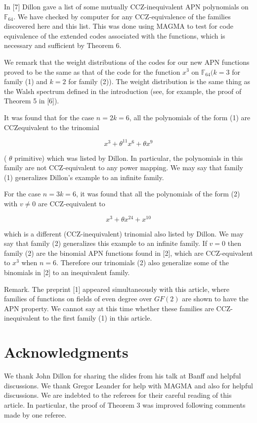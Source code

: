 \documentclass[10pt]{article}
\begin{document}
In [7] Dillon gave a list of some mutually CCZ-inequivalent APN polynomials on $\mathbb{F}_{64}$. We have checked by computer for any CCZ-equivalence of the families discovered here and this list. This was done using MAGMA to test for code equivalence of the extended codes associated with the functions, which is necessary and sufficient by Theorem 6.

We remark that the weight distributions of the codes for our new APN functions proved to be the same as that of the code for the function $x^{3}$ on $\mathbb{F}_{64}(k=3$ for family (1) and $k=2$ for family (2)). The weight distribution is the same thing as the Walsh spectrum defined in the introduction (see, for example, the proof of Theorem 5 in [6]).

It was found that for the case $n=2 k=6$, all the polynomials of the form (1) are CCZequivalent to the trinomial

$$
x^{3}+\theta^{11} x^{6}+\theta x^{9}
$$

( $\theta$ primitive) which was listed by Dillon. In particular, the polynomials in this family are not CCZ-equivalent to any power mapping. We may say that family (1) generalizes Dillon's example to an infinite family.

For the case $n=3 k=6$, it was found that all the polynomials of the form (2) with $v \neq 0$ are CCZ-equivalent to

$$
x^{3}+\theta x^{24}+x^{10}
$$

which is a different (CCZ-inequivalent) trinomial also listed by Dillon. We may say that family (2) generalizes this example to an infinite family. If $v=0$ then family (2) are the binomial APN functions found in [2], which are CCZ-equivalent to $x^{3}$ when $n=6$. Therefore our trinomials (2) also generalize some of the binomials in [2] to an inequivalent family.

Remark. The preprint [1] appeared simultaneously with this article, where families of functions on fields of even degree over $G F(2)$ are shown to have the APN property. We cannot say at this time whether these families are CCZ-inequivalent to the first family (1) in this article.

\section*{Acknowledgments}
We thank John Dillon for sharing the slides from his talk at Banff and helpful discussions. We thank Gregor Leander for help with MAGMA and also for helpful discussions. We are indebted to the referees for their careful reading of this article. In particular, the proof of Theorem 3 was improved following comments made by one referee.
\end{document}
